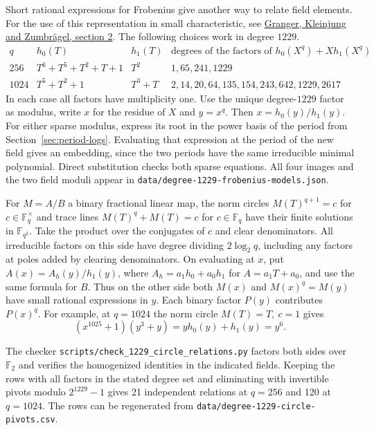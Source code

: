 \documentclass[11pt]{article}
\begin{document}
Short rational expressions for Frobenius give another way to relate
field elements. For the use of this representation in small
characteristic, see
\href{https://arxiv.org/abs/1402.3668}{Granger, Kleinjung and Zumbr\"agel,
section 2}. The following choices work in degree \(1229\).
\[
\begin{array}{r|l|l|l}
 q & h_0(T) & h_1(T)&
 \text{degrees of the factors of } h_0(X^q)+Xh_1(X^q)\\\hline
256&T^6+T^5+T^2+T+1&T^2&1,65,241,1229\\
1024&T^5+T^2+1&T^3+T&2,14,20,64,135,154,243,642,1229,2617
\end{array}
\]
In each case all factors have multiplicity one. Use the unique
degree-\(1229\) factor as modulus, write \(x\) for the residue of \(X\)
and \(y=x^q\). Then \(x=h_0(y)/h_1(y)\).
For either sparse modulus, express its root in the power basis of the
period from Section~\ref{sec:period-logs}. Evaluating that expression
at the period of the new field gives an embedding, since the two periods
have the same irreducible minimal polynomial. Direct substitution
checks both sparse equations. All four images and the two field
moduli appear in \nolinkurl{data/degree-1229-frobenius-models.json}.

For \(M=A/B\) a binary fractional linear map, the norm circles
\(M(T)^{q+1}=c\) for \(c\in\mathbb F_q^\times\) and trace lines
\(M(T)^q+M(T)=c\) for \(c\in\mathbb F_q\) have their finite solutions
in \(\mathbb F_{q^2}\). Take the product over the conjugates of \(c\)
and clear denominators. All irreducible factors on this side have
degree dividing \(2\log_2 q\), including any factors at poles added by
clearing denominators. On evaluating at \(x\), put
\(A(x)=A_h(y)/h_1(y)\), where \(A_h=a_1h_0+a_0h_1\) for
\(A=a_1T+a_0\), and use the same formula for \(B\).
Thus on the other side both \(M(x)\) and \(M(x)^q=M(y)\) have
small rational expressions in \(y\). Each binary factor \(P(y)\)
contributes \(P(x)^q\). For example, at \(q=1024\) the norm
circle \(M(T)=T,\ c=1\) gives
\[
      (x^{1025}+1)(y^3+y)=yh_0(y)+h_1(y)=y^6 .
\]

The checker \nolinkurl{scripts/check_1229_circle_relations.py} factors
both sides over \(\mathbb F_2\) and verifies the homogenized identities
in the indicated fields. Keeping the rows with all factors in the
stated degree set and eliminating with invertible pivots modulo
\(2^{1229}-1\) gives 21 independent relations at \(q=256\) and
120 at \(q=1024\). The rows can be regenerated from
\nolinkurl{data/degree-1229-circle-pivots.csv}.
\end{document}
